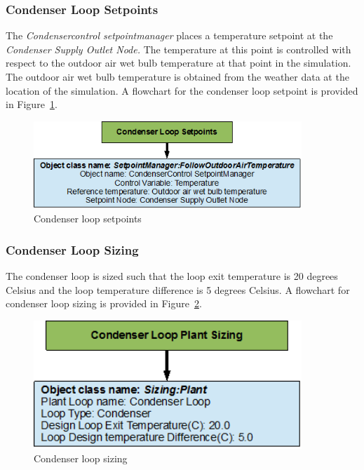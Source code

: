 \subsubsection{Condenser Loop Setpoints}\label{condenser-loop-setpoints-001}

The \emph{Condensercontrol setpointmanager} places a temperature setpoint at the \emph{Condenser Supply Outlet Node.} The temperature at this point is controlled with respect to the outdoor air wet bulb temperature at that point in the simulation. The outdoor air wet bulb temperature is obtained from the weather data at the location of the simulation. A flowchart for the condenser loop setpoint is provided in Figure~\ref{fig:condenser-loop-setpoints}.

\begin{figure}[hbtp] %
\centering
\includegraphics[width=0.9\textwidth, height=0.9\textheight, keepaspectratio=true]{media/image039.png}
\caption{Condenser loop setpoints \protect \label{fig:condenser-loop-setpoints}}
\end{figure}

\subsubsection{Condenser Loop Sizing}\label{condenser-loop-sizing-000}

The condenser loop is sized such that the loop exit temperature is 20 degrees Celsius and the loop temperature difference is 5 degrees Celsius. A flowchart for condenser loop sizing is provided in Figure~\ref{fig:condenser-loop-sizing}.

\begin{figure}[hbtp] %
\centering
\includegraphics[width=0.9\textwidth, height=0.9\textheight, keepaspectratio=true]{media/image040.png}
\caption{Condenser loop sizing \protect \label{fig:condenser-loop-sizing}}
\end{figure}
